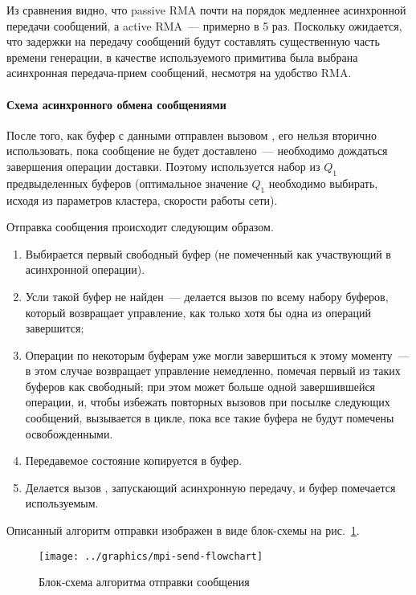 Из сравнения видно, что passive RMA почти на порядок медленнее асинхронной передачи
сообщений, а active RMA~--- примерно в 5 раз. Поскольку ожидается, что задержки на
передачу сообщений будут составлять существенную часть времени генерации, в качестве
используемого примитива была выбрана асинхронная передача-прием сообщений, несмотря на
удобство RMA.

\paragraph{Схема асинхронного обмена сообщениями}

После того, как буфер с данными отправлен вызовом , его нельзя вторично
использовать, пока сообщение не будет доставлено~--- необходимо дождаться завершения
операции доставки. Поэтому используется набор из $Q_1$ предвыделенных буферов (оптимальное
значение $Q_1$ необходимо выбирать, исходя из параметров кластера, скорости работы
сети\etc).

Отправка сообщения происходит следующим образом.
\begin{enumerate}
\item Выбирается первый свободный буфер (не помеченный как участвующий в асинхронной
  операции).
\item Усли такой буфер не найден~--- делается вызов  по всему набору
  буферов, который возвращает управление, как только хотя бы одна из операций завершится;
\item Операции по некоторым буферам уже могли завершиться к этому моменту~--- в этом
  случае  возвращает управление немедленно, помечая первый из таких буферов
  как свободный; при этом может больше одной завершившейся операции, и, чтобы избежать
  повторных вызовов  при посылке следующих сообщений, 
  вызывается в цикле, пока все такие буфера не будут помечены освобожденными.
\item Передавемое состояние копируется в буфер.
\item Делается вызов , запускающий асинхронную передачу, и буфер помечается
  используемым.
\end{enumerate}

Описанный алгоритм отправки изображен в виде блок-схемы на
рис.~\ref{fig:mpi-send-flowchart}.

\begin{figure}[!tb]
  \centering
  \texttt{[image: ../graphics/mpi-send-flowchart]}
  \caption{Блок-схема алгоритма отправки сообщения}
  \label{fig:mpi-send-flowchart}
\end{figure}

